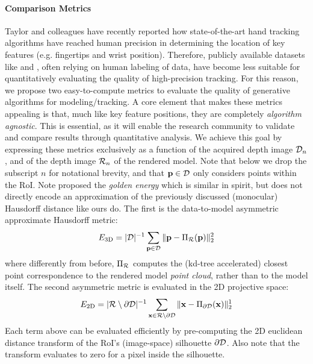 \paragraph{Comparison Metrics}
Taylor and colleagues  have recently reported how state-of-the-art hand tracking algorithms have reached human precision in determining the location of key features (e.g. fingertips and wrist position). Therefore, publicly available datasets like \cite{tompson2014real} and \cite{sridhar2013multicam}, often relying on human labeling of data, have become less suitable for quantitatively evaluating the quality of high-precision tracking. 
% 
For this reason, we propose two easy-to-compute metrics to evaluate the quality of generative algorithms for modeling/tracking. A core element that makes these metrics appealing is that, much like key feature positions, they are completely \emph{algorithm agnostic}. This is essential, as it will enable the research community to validate and compare results through quantitative analysis. 
% 
We achieve this goal by expressing these metrics exclusively as a function of the acquired depth image $\mathcal{D}_n$, and of the depth image $\mathcal{R}_{n}$ of the rendered model. Note that below we drop the subscript $n$ for notational brevity, and that $\mathbf{p} \in \mathcal{D}$ only considers points within the RoI. Note \cite{sharp2015accurate} proposed the \emph{golden energy} which is similar in spirit, but does not directly encode an approximation of the previously discussed (monocular) Hausdorff distance like ours do. The first is the data-to-model asymmetric approximate Hausdorff metric: 
% 
\begin{equation}
E_\text{3D} = |\mathcal{D}|^{-1} \sum_{\mathbf{p} \in \mathcal{D}} \| \mathbf{p} - \Pi_{\mathcal{R}}(\mathbf{p}) \|_2^2
\label{eq:metric1}
\end{equation}
% 
where differently from before, $\Pi_{\mathcal{R}}$ computes the (kd-tree accelerated) closest point correspondence to the rendered model \emph{point cloud}, rather than to the model itself. The second asymmetric metric is evaluated in the 2D projective space:
% 
\begin{eqnarray}
E_\text{2D} = |\mathcal{R} \setminus \partial\mathcal{D}|^{-1} 
\sum_{\mathbf{x} \in \mathcal{R} \setminus \partial\mathcal{D}} \| \mathbf{x} - \Pi_{\partial\mathcal{D}}(\mathbf{x}) \|^1_2
\label{eq:metric2}
\end{eqnarray}
% 
Each term above can be evaluated efficiently by pre-computing the 2D euclidean distance transform of the RoI's (image-space) silhouette $\partial \mathcal{D}$. Also note that the transform evaluates to zero for a pixel inside the silhouette.

